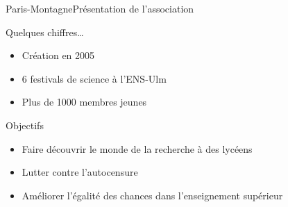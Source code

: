 


\maketitle

\begin{frame}{Paris-Montagne}{Présentation de l'association}

\begin{block}{Quelques chiffres\ldots}
\begin{itemize}
\item Création en 2005
\item 6 festivals de science à l'ENS-Ulm
\item Plus de 1000 membres jeunes
\end{itemize}
\end{block}

\begin{block}{Objectifs}

\begin{itemize}
\item Faire découvrir le monde de la recherche à des lycéens
\item Lutter contre l'autocensure
\item Améliorer l'égalité des chances dans l'enseignement supérieur
\end{itemize}

\end{block}

\end{frame}



